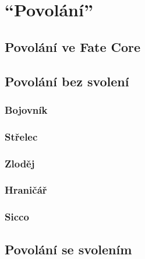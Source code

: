 \chapter{``Povolání''}
\label{chap:speciality}

\section{Povolání ve Fate Core}
\label{sec:povolani-fate-core}

\section{Povolání bez svolení}
\label{sec:pov-bez-svoleni}

\subsection{Bojovník}
\label{sec:pov-bojovnik}

\subsection{Střelec}
\label{sec:pov-strelec}

\subsection{Zloděj}
\label{sec:pov-zlodej}

\subsection{Hraničář}
\label{sec:pov-hranicar}

\subsection{Sicco}
\label{sec:pov-sicco}


\section{Povolání se svolením}
\label{sec:pov-se-svolenim}

